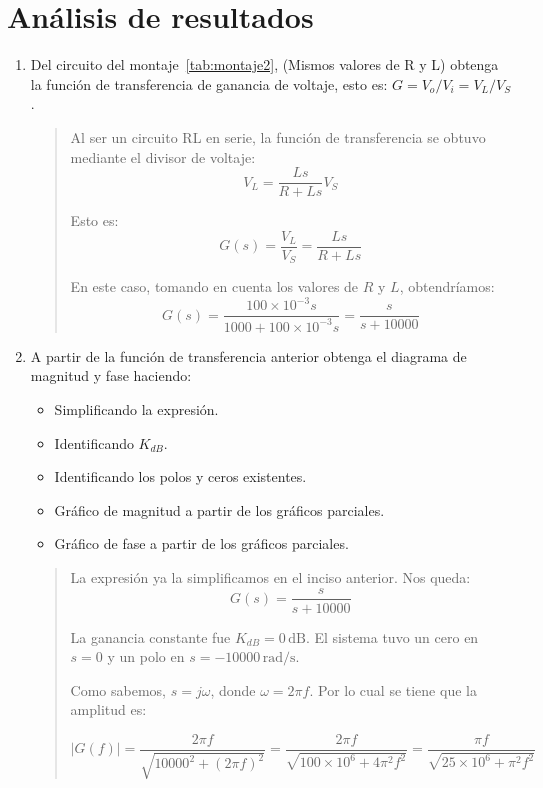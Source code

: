 \documentclass[12pt,a4paper]{article}
\begin{document}
\section{Análisis de resultados}
\begin{enumerate}
    \item Del circuito del montaje~\ref{tab:montaje2}, (Mismos valores de R y L) obtenga la función de transferencia de ganancia de voltaje, esto es: $G=V_o/V_i=V_L/V_S$.
    \begin{quote}
        Al ser un circuito RL en serie, la función de transferencia se obtuvo mediante el divisor de voltaje:
        \[
            V_L = \frac{Ls}{R + Ls}V_S
        \]

        Esto es:
        \[
            G(s) = \frac{V_L}{V_S} = \frac{Ls}{R + Ls}
        \]

        En este caso, tomando en cuenta los valores de $R$ y $L$, obtendríamos:
        \[
            G(s) = \frac{100\times10^{-3}s}{1000 + 100\times10^{-3}s} = \frac{s}{s + 10000}
        \]
    \end{quote}

    \item A partir de la función de transferencia anterior obtenga el diagrama de magnitud y fase haciendo:
    \begin{itemize}
        \item Simplificando la expresión.
        \item Identificando \(K_{dB}\).
        \item Identificando los polos y ceros existentes.
        \item Gráfico de magnitud a partir de los gráficos parciales.
        \item Gráfico de fase a partir de los gráficos parciales.
    \end{itemize}
    \begin{quote}
        La expresión ya la simplificamos en el inciso anterior. Nos queda:
        \[
            G(s) = \frac{s}{s + 10000}
        \]

        La ganancia constante fue \(K_{dB}=0\,\text{dB}\). El sistema tuvo un cero en \(s=0\) y un polo en \(s=-10000\,\si{\radian\per\second}\).

        Como sabemos, $s = j\omega$, donde $\omega = 2\pi f$. Por lo cual se tiene que la amplitud es:

        \[
            |G(f)| = \frac{2\pi f}{\sqrt{10000^2+{(2\pi f)}^2}} = \frac{2\pi f}{\sqrt{100\times10^6 + 4\pi^2 f^2}} = \frac{\pi f}{\sqrt{25\times10^6 + \pi^2 f^2}}
        \]


\end{quote}
\end{enumerate}
\end{document}
